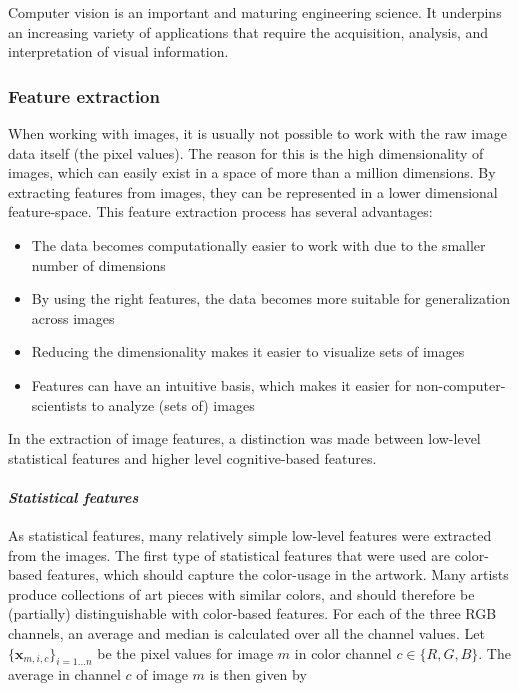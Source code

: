 Computer vision is an important and maturing engineering science. It underpins an increasing variety of applications that require the acquisition, analysis, and interpretation of visual information.

\subsubsection{Feature extraction}
When working with images, it is usually not possible to work with the raw image data itself (the pixel values). The reason for this is the high dimensionality of images, which can easily exist in a space of more than a million dimensions. By extracting features from images, they can be represented in a lower dimensional feature-space.  This feature extraction process has several advantages:
\begin{itemize}
\item The data becomes computationally easier to work with due to the smaller number of dimensions
\item By using the right features, the data becomes more suitable for generalization across images
\item Reducing the dimensionality makes it easier to visualize sets of images
\item Features can have an intuitive basis, which makes it easier for non-computer-scientists to analyze (sets of) images
\end{itemize}

In the extraction of image features, a distinction was made between low-level statistical features and higher level cognitive-based features.

\paragraph{\textit{Statistical features}}
As statistical features, many relatively simple low-level features were extracted from the images.
The first type of statistical features that were used are color-based features, which should capture the color-usage in the artwork. Many artists produce collections of art pieces with similar colors, and should therefore be (partially) distinguishable with color-based features. For each of the three RGB channels, an average and median is calculated over all the channel values. Let $\{\mathbf{x}_{m,i,c} \}_{i=1\dots n}$ be the pixel values for image $m$ in color channel $c \in \{R,G,B \}$. The average in channel $c$ of image $m$ is then given by 

